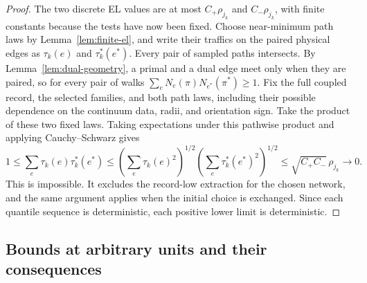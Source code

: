 \begin{proof}
The two discrete EL values are at most \(C_+\rho_{j_k}\) and
\(C_-\rho_{j_k}\), with finite constants because the tests have now been
fixed.  Choose near-minimum path laws by Lemma~\ref{lem:finite-el}, and
write their traffics on the paired physical edges as \(\tau_k(e)\) and
\(\tau_k^*(e^*)\).  Every pair of sampled paths intersects.  By
Lemma~\ref{lem:dual-geometry}, a primal and a dual edge meet only when
they are paired, so for every pair of walks
\(\sum_eN_e(\pi)N_{e^*}(\pi^*)\ge1\).  Fix the full coupled record, the
selected families, and both path laws, including their possible dependence
on the continuum data, radii, and orientation sign.  Take the product of
these two fixed laws.  Taking expectations under this pathwise product and applying
Cauchy--Schwarz gives
\[
 1\le\sum_e\tau_k(e)\tau_k^*(e^*)
 \le
 \left(\sum_e\tau_k(e)^2\right)^{1/2}
 \left(\sum_e\tau_k^*(e^*)^2\right)^{1/2}
 \le\sqrt{C_+C_-}\,\rho_{j_k}\longrightarrow0.
\]
This is impossible.  It excludes the record-low extraction for the
chosen network, and the same argument applies when the initial choice
is exchanged.  Since each quantile sequence is deterministic, each
positive lower limit is deterministic.
\end{proof}

\subsection{Bounds at arbitrary units and their consequences}

